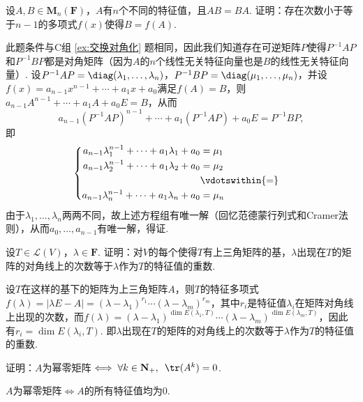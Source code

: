 \begin{exercise}
\begin{exgroup}
        \item 设$A,B\in \mathbf{M}_n(\mathbf{F})$，$A$有$n$个不同的特征值，且$AB=BA$. 证明：存在次数小于等于$n-1$的多项式$f(x)$使得$B=f(A)$.
        \begin{answer}
            此题条件与C组 \ref*{ex:交换对角化} 题相同，因此我们知道存在可逆矩阵$P$使得$P^{-1}AP$和$P^{-1}BP$都是对角矩阵（因为$A$的$n$个线性无关特征向量也是$B$的线性无关特征向量）. 设$P^{-1}AP=\diag(\lambda_1,\ldots,\lambda_n)$，$P^{-1}BP=\diag(\mu_1,\ldots,\mu_n)$，并设$f(x)=a_{n-1}x^{n-1}+\cdots+a_1x+a_0$满足$f(A)=B$，则$a_{n-1}A^{n-1}+\cdots+a_1A+a_0E=B$，从而
          \[a_{n-1}(P^{-1}AP)^{n-1}+\cdots+a_1(P^{-1}AP)+a_0E=P^{-1}BP,\]
          即
          \[\begin{cases} \begin{aligned}
                      a_{n-1}\lambda_1^{n-1}+\cdots+a_1\lambda_1+a_0 & = \mu_1           \\
                      a_{n-1}\lambda_2^{n-1}+\cdots+a_1\lambda_2+a_0 & = \mu_2           \\
                                                                     & \vdotswithin{ = } \\
                      a_{n-1}\lambda_n^{n-1}+\cdots+a_1\lambda_n+a_0 & = \mu_n
                  \end{aligned} \end{cases}\]
          由于$\lambda_1,\ldots,\lambda_n$两两不同，故上述方程组有唯一解（回忆范德蒙行列式和Cramer法则），从而$a_0,\ldots,a_{n-1}$有唯一解，得证.
        \end{answer}

        \item 设$T\in \mathcal{L}(V)$，$\lambda\in\mathbf{F}$. 证明：对$V$的每个使得$T$有上三角矩阵的基，$\lambda$出现在$T$的矩阵的对角线上的次数等于$\lambda$作为$T$的特征值的重数.
        \begin{answer}
            设$T$在这样的基下的矩阵为上三角矩阵$A$，则$T$的特征多项式$f(\lambda)=|\lambda E-A|=(\lambda-\lambda_1)^{r_1}\cdots(\lambda-\lambda_m)^{r_m}$，其中$r_i$是特征值$\lambda_i$在矩阵对角线上出现的次数，而$f(\lambda)=(\lambda-\lambda_1)^{\dim E(\lambda_1,T)}\cdots(\lambda-\lambda_m)^{\dim E(\lambda_m,T)}$，因此有$r_i=\dim E(\lambda_i,T)$.
            即$\lambda$出现在$T$的矩阵的对角线上的次数等于$\lambda$作为$T$的特征值的重数.
        \end{answer}

        \item 证明：$A$为幂零矩阵$\iff \forall k \in \mathbf{N}_+,\enspace\tr(A^k)=0$.
        \begin{answer}
            $A$为幂零矩阵$\iff A$的所有特征值均为0.


\end{answer}
\end{exgroup}
\end{exercise}
